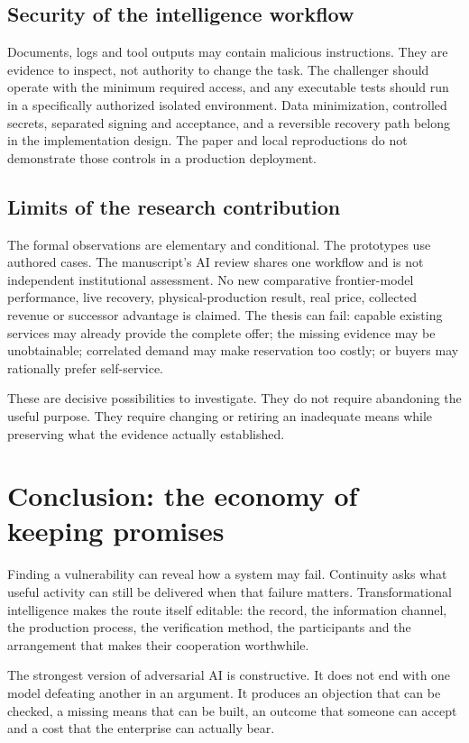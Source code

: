 \documentclass[11pt,a4paper]{article}
\begin{document}
\subsection{Security of the intelligence workflow}
Documents, logs and tool outputs may contain malicious instructions. They are evidence to inspect, not authority to change the task. The challenger should operate with the minimum required access, and any executable tests should run in a specifically authorized isolated environment. Data minimization, controlled secrets, separated signing and acceptance, and a reversible recovery path belong in the implementation design. The paper and local reproductions do not demonstrate those controls in a production deployment.

\subsection{Limits of the research contribution}
The formal observations are elementary and conditional. The prototypes use authored cases. The manuscript's AI review shares one workflow and is not independent institutional assessment. No new comparative frontier-model performance, live recovery, physical-production result, real price, collected revenue or successor advantage is claimed. The thesis can fail: capable existing services may already provide the complete offer; the missing evidence may be unobtainable; correlated demand may make reservation too costly; or buyers may rationally prefer self-service.

These are decisive possibilities to investigate. They do not require abandoning the useful purpose. They require changing or retiring an inadequate means while preserving what the evidence actually established.

\section{Conclusion: the economy of keeping promises}
Finding a vulnerability can reveal how a system may fail. Continuity asks what useful activity can still be delivered when that failure matters. Transformational intelligence makes the route itself editable: the record, the information channel, the production process, the verification method, the participants and the arrangement that makes their cooperation worthwhile.

The strongest version of adversarial AI is constructive. It does not end with one model defeating another in an argument. It produces an objection that can be checked, a missing means that can be built, an outcome that someone can accept and a cost that the enterprise can actually bear.
\end{document}
